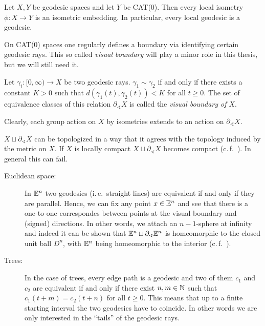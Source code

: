 \begin{prop}
  Let \(X,Y\) be geodesic spaces and let \(Y\) be CAT(0). Then every local isometry \(\phi \colon X \to Y\) is an isometric embedding. In particular, every local geodesic is a geodesic.
\end{prop}

On CAT(0) spaces one regularly defines a boundary via identifying certain geodesic rays. This so called \emph{visual boundary} will play a minor role in this thesis, but we will still need it. 

\begin{defin}
  Let \(\gamma_i \colon [0, \infty) \to X\) be two geodesic rays. \(\gamma_1 \sim \gamma_2\) if and only if there exists a constant \(K > 0 \) such that \(d(\gamma_1(t), \gamma_2(t)) < K\) for all \(t \geq 0\). The set of equivalence classes of this relation \(\partial_\sphericalangle X\) is called the \emph{visual boundary of \(X\)}.

  Clearly, each group action on \(X\) by isometries extends to an action on \(\partial_\sphericalangle X\).
\end{defin}

\begin{rem}
  \(X \sqcup \partial_{\sphericalangle}X\) can be topologized in a way that it agrees with the topology induced by the metric on \(X\). If \(X\) is locally compact \(X \sqcup \partial_\sphericalangle X\) becomes compact (c.\,f.~\cite[Sec.~II.8]{MR1744486}). In general this can fail.
\end{rem}

\begin{bsp}
  \begin{description}
  \item[Euclidean space:] In \(\mathbb{E}^n\) two geodesics (i.\,e.\ straight lines) are equivalent if and only if they are parallel. Hence, we can fix any point \(x \in \mathbb{E}^n\) and see that there is a one-to-one correspondes between points at the visual boundary and (signed) directions. In other words, we attach an \(n-1\)-sphere at infinity and indeed it can be shown that \(\mathbb{E}^n \sqcup \partial_\sphericalangle \mathbb{E}^n\) is homeomorphic to the closed unit ball \(D^n\), with \(\mathbb{E}^n\) being homeomorphic to the interior (c.\,f.~\cite[Section~II.8]{MR1744486}).
  \item[Trees:] In the case of trees, every edge path is a geodesic and two of them \(c_1\) and \(c_2\) are equivalent if and only if there exist \(n,m \in \mathbb{N}\) such that \(c_1(t+m) = c_2(t+n)\) for all \(t\geq0\). This means that up to a finite starting interval the two geodesics have to coincide. In other words we are only interested in the \enquote{tails} of the geodesic rays.
  \end{description}
\end{bsp}

